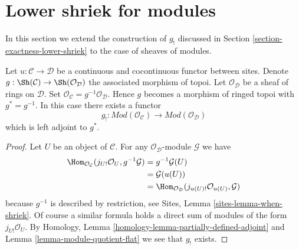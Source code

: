 \section{Lower shriek for modules}
\label{section-lower-shriek-modules}

\noindent
In this section we extend the construction of $g_!$ discussed
in Section \ref{section-exactness-lower-shriek} to the case of
sheaves of modules.

\begin{lemma}
\label{lemma-lower-shriek-modules}
Let $u : \mathcal{C} \to \mathcal{D}$ be a continuous and cocontinuous
functor between sites. Denote
$g : \Sh(\mathcal{C}) \to \Sh(\mathcal{O}_\mathcal{D})$ the associated
morphism of topoi. Let $\mathcal{O}_\mathcal{D}$ be a sheaf of rings
on $\mathcal{D}$. Set
$\mathcal{O}_\mathcal{C} = g^{-1}\mathcal{O}_\mathcal{D}$.
Hence $g$ becomes a morphism of ringed topoi with $g^* = g^{-1}$.
In this case there exists a functor
$$
g_! :
\textit{Mod}(\mathcal{O}_\mathcal{C})
\longrightarrow
\textit{Mod}(\mathcal{O}_\mathcal{D})
$$
which is left adjoint to $g^*$.
\end{lemma}

\begin{proof}
Let $U$ be an object of $\mathcal{C}$. For any
$\mathcal{O}_\mathcal{D}$-module $\mathcal{G}$ we have
\begin{align*}
\Hom_{\mathcal{O}_\mathcal{C}}(j_{U!}\mathcal{O}_U, g^{-1}\mathcal{G})
& =
g^{-1}\mathcal{G}(U) \\
& =
\mathcal{G}(u(U)) \\
& =
\Hom_{\mathcal{O}_\mathcal{D}}(j_{u(U)!}\mathcal{O}_{u(U)}, \mathcal{G})
\end{align*}
because $g^{-1}$ is described by restriction, see
Sites, Lemma \ref{sites-lemma-when-shriek}.
Of course a similar formula holds a direct sum of modules
of the form $j_{U!}\mathcal{O}_U$. By
Homology, Lemma \ref{homology-lemma-partially-defined-adjoint}
and
Lemma \ref{lemma-module-quotient-flat}
we see that $g_!$ exists.
\end{proof}

